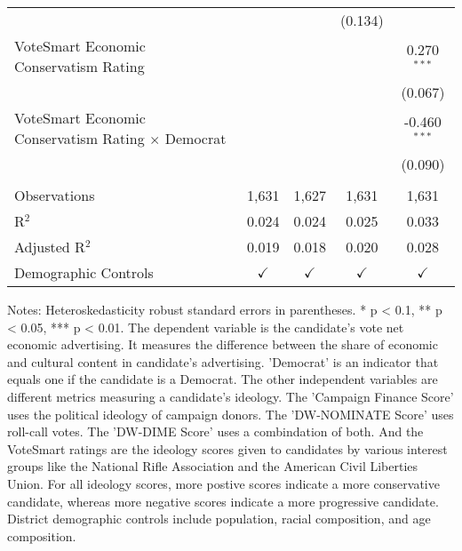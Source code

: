 \begin{table}[htbp]
\begin{tabular}{lcccc}
                                                                &                &                & (0.134)        &   \\   
      VoteSmart Economic Conservatism Rating                    &                &                &                & 0.270$^{***}$\\   
                                                                &                &                &                & (0.067)\\   
      VoteSmart Economic Conservatism Rating $\times$ Democrat  &                &                &                & -0.460$^{***}$\\   
                                                                &                &                &                & (0.090)\\   
       \\
      Observations                                              & 1,631          & 1,627          & 1,631          & 1,631\\  
      R$^2$                                                     & 0.024          & 0.024          & 0.025          & 0.033\\  
      Adjusted R$^2$                                            & 0.019          & 0.018          & 0.020          & 0.028\\  
      Demographic Controls                                      & $\checkmark$   & $\checkmark$   & $\checkmark$   & $\checkmark$\\   
      \bottomrule
   \end{tabular}
   
   \par \raggedright 
   \footnotesize Notes: Heteroskedasticity robust standard errors in parentheses. * p < 0.1, ** p < 0.05, *** p < 0.01.  The dependent variable is the candidate's vote net economic advertising. It measures the difference between the share of economic and cultural content in candidate's advertising. 'Democrat' is an indicator that equals one if the candidate is a Democrat. The other independent variables are different metrics measuring a candidate's ideology. The 'Campaign Finance Score' uses the political ideology of campaign donors. The 'DW-NOMINATE Score' uses roll-call votes. The 'DW-DIME Score' uses a combindation of both. And the VoteSmart ratings are the ideology scores given to candidates by various interest groups like the National Rifle Association and the American Civil Liberties Union. For all ideology scores, more postive scores indicate a more conservative candidate, whereas more negative scores indicate a more progressive candidate. District demographic controls include population, racial composition, and age composition.
\end{table}


